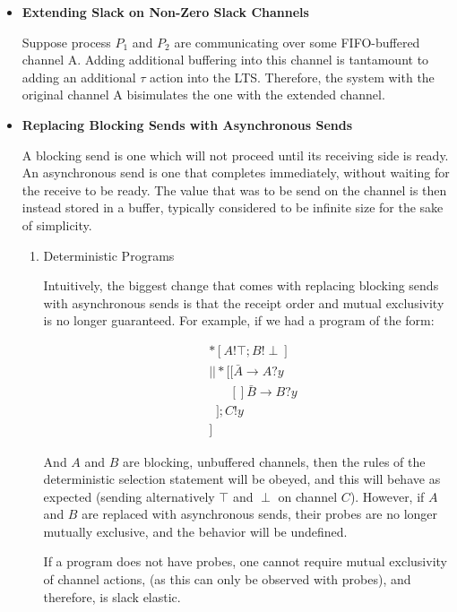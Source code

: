 \documentclass[times, 10pt]{article}
\begin{document}
\begin{itemize}

\item {\bf Extending Slack on Non-Zero Slack Channels}

Suppose process $P_1$ and $P_2$ are communicating over some FIFO-buffered
channel A.  Adding additional buffering into this channel is tantamount to
adding an additional $\tau$ action into the LTS.  Therefore, the system with the
original channel A bisimulates the one with the extended channel. 

\item {\bf Replacing Blocking Sends with Asynchronous Sends}

A blocking send is one which will not proceed until its receiving side is ready.
An asynchronous send is one that completes immediately, without waiting for the
receive to be ready. The value that was to be send on the channel is then
instead stored in a buffer, typically considered to be infinite size for the
sake of simplicity.

\begin{enumerate}

\item Deterministic Programs

Intuitively, the biggest change that comes with replacing blocking sends with
asynchronous sends is that the receipt order and mutual exclusivity is no longer
guaranteed.  For example, if we had a program of the form:

\begin{align*}
&*[A!\top; B!\!\perp] \\
&|| *[[ \bar{A} \rightarrow A?y \\
&\;\;\;\;\;\; [] \bar{B} \rightarrow B?y \\
&\;\;]; C!y \\
&]
\end{align*}

And $A$ and $B$ are blocking, unbuffered channels, then the rules of the
deterministic selection statement will be obeyed, and this will behave as
expected (sending alternatively $\top$ and $\perp$ on channel $C$).  However, if
$A$ and $B$ are replaced with asynchronous sends, their probes are no longer
mutually exclusive, and the behavior will be undefined. 

If a program does not have probes, one cannot require mutual exclusivity of
channel actions, (as this can only be observed with probes), and therefore, is
slack elastic.



\end{enumerate}
\end{itemize}
\end{document}
